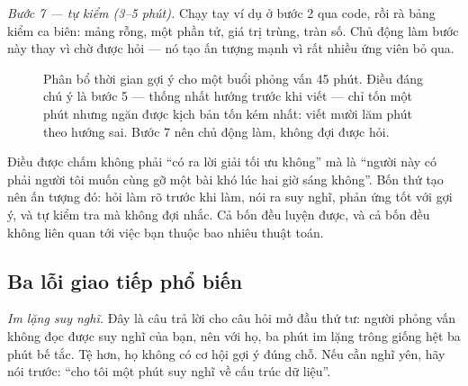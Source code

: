 \documentclass[../../algorithm.tex]{subfiles}
\begin{document}
\emph{Bước 7 --- tự kiểm (3--5 phút).} Chạy tay ví dụ ở bước 2 qua code, rồi rà bảng kiểm ca biên: mảng rỗng, một phần tử, giá trị trùng, tràn số. Chủ động làm bước này thay vì chờ được hỏi --- nó tạo ấn tượng mạnh vì rất nhiều ứng viên bỏ qua.

\begin{figure}[H]\centering
{}
\caption{Phân bổ thời gian gợi ý cho một buổi phỏng vấn 45 phút. Điều đáng chú ý là bước 5 --- thống nhất hướng trước khi viết --- chỉ tốn một phút nhưng ngăn được kịch bản tốn kém nhất: viết mười lăm phút theo hướng sai. Bước 7 nên chủ động làm, không đợi được hỏi.}
\label{fig:interview-timeline}
\end{figure}

\begin{cannho}
Điều được chấm không phải ``có ra lời giải tối ưu không'' mà là ``người này có phải người tôi muốn cùng gỡ một bài khó lúc hai giờ sáng không''. Bốn thứ tạo nên ấn tượng đó: hỏi làm rõ trước khi làm, nói ra suy nghĩ, phản ứng tốt với gợi ý, và tự kiểm tra mà không đợi nhắc. Cả bốn đều luyện được, và cả bốn đều không liên quan tới việc bạn thuộc bao nhiêu thuật toán.
\end{cannho}

\subsection{Ba lỗi giao tiếp phổ biến}

\emph{Im lặng suy nghĩ.} Đây là câu trả lời cho câu hỏi mở đầu thứ tư: người phỏng vấn không đọc được suy nghĩ của bạn, nên với họ, ba phút im lặng trông giống hệt ba phút bế tắc. Tệ hơn, họ không có cơ hội gợi ý đúng chỗ. Nếu cần nghĩ yên, hãy nói trước: ``cho tôi một phút suy nghĩ về cấu trúc dữ liệu''.
\end{document}
